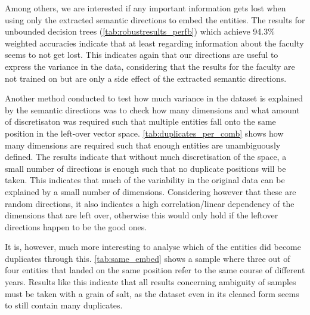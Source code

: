 Among others, we are interested if any important information gets lost when using only the extracted semantic directions to embed the entities. The results for unbounded decision trees (\autoref{tab:robustresults_perfb}) which achieve 94.3\% weighted accuracies indicate that at least regarding information about the faculty seems to not get lost. This indicates again that our directions are useful to express the variance in the data, considering that the results for the faculty are not trained on but are only a side effect of the extracted semantic directions. 

Another method conducted to test how much variance in the dataset is explained by the semantic directions was to check how many dimensions and what amount of discretisaton was required such that multiple entities fall onto the same position in the left-over vector space. \autoref{tab:duplicates_per_comb} shows how many dimensions are required such that enough entities are unambiguously defined. The results indicate that without much discretisation of the space, a small number of directions is enough such that no duplicate positions will be taken. This indicates that much of the variability in the original data can be explained by a small number of dimensions. Considering however that these are random directions, it also indicates a high correlation/linear dependency of the dimensions that are left over, otherwise this would only hold if the leftover directions happen to be the good ones.

It is, however, much more interesting to analyse which of the entities did become duplicates through this. \autoref{tab:same_embed} shows a sample where three out of four entities that landed on the same position refer to the same course of different years. Results like this indicate that all results concerning ambiguity of samples must be taken with a grain of salt, as the dataset even in its cleaned form seems to still contain many duplicates.

\begin{table}[h]
    \centering
    \caption{Sample courses falling onto the same embedding after discretisation}
    \label{tab:same_embed}
\end{table}

